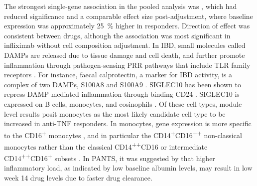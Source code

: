 The strongest single-gene association in the pooled analysis was , 
which had reduced significance and a comparable effect size post-adjustment,
where baseline expression was approximately \SI{25}{\percent} higher in responders.
Direction of effect was consistent between drugs, although the association was most significant in infliximab without cell composition adjustment.
In \gls{IBD}, small molecules called \glspl{DAMP} are released due to tissue damage and cell death, 
and further promote inflammation through pathogen-sensing \gls{PRR} pathways that include \gls{TLR} family receptors \autocite{boyapati2016GutMucosalDAMPs,desouza2016ImmunopathogenesisIBDCurrent}.
For instance, faecal calprotectin, a marker for \gls{IBD} activity, is a complex of two \glspl{DAMP}, S100A8 and S100A9 \autocite{desouza2016ImmunopathogenesisIBDCurrent}.
SIGLEC10 has been shown to repress \gls{DAMP}-mediated inflammation through binding CD24 \autocite{boyapati2016GutMucosalDAMPs}.
SIGLEC10 is expressed on B cells, monocytes, and eosinophils \autocite{crocker2007SiglecsTheirRoles}.
Of these cell types, module level results posit monocytes as the most likely candidate cell type to be increased in anti-\gls{TNF} responders.
In monocytes,  gene expression is more specific to the CD16\textsuperscript{+} monocytes \autocite{martinez2009TranscriptomeHumanMonocyte},
and in particular the CD14\textsuperscript{+}CD16\textsuperscript{++} non-classical monocytes rather than the classical CD14\textsuperscript{++}CD16\textsuperscript{\textminus} or intermediate CD14\textsuperscript{++}CD16\textsuperscript{+} subsets \autocite{villani2017SinglecellRNAseqReveals}.
In \gls{PANTS}, it was suggested by \textcite{kennedy2019PredictorsAntiTNFTreatment} that higher inflammatory load, 
as indicated by low baseline albumin levels,
may result in low week 14 drug levels due to faster drug clearance.
